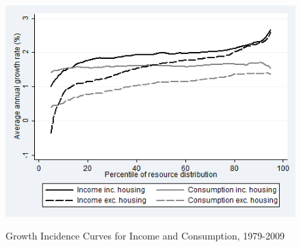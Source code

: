 \begin{figure}
\caption{Growth Incidence Curves for Income and Consumption, 1979-2009}
\centering
\includegraphics[width=.8\linewidth]{pictures/gic_7.png}
\label{fig:gicall}
\end{figure}

